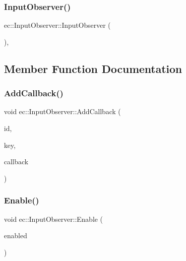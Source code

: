 \mbox{\label{classec_1_1_input_observer_ac8aa31f24d3ea4d627ab7fe899c93b03}} 
\subsubsection{\texorpdfstring{Input\+Observer()}{InputObserver()}}
{\footnotesize\ttfamily ec\+::\+Input\+Observer\+::\+Input\+Observer (\begin{DoxyParamCaption}{ }\end{DoxyParamCaption})\hspace{0.3cm}{\ttfamily [explicit]}, {\ttfamily [protected]}}



\subsection{Member Function Documentation}
\mbox{\label{classec_1_1_input_observer_a361289fd19508f86fa0213de9b64ba50}} 
\subsubsection{\texorpdfstring{Add\+Callback()}{AddCallback()}}
{\footnotesize\ttfamily void ec\+::\+Input\+Observer\+::\+Add\+Callback (\begin{DoxyParamCaption}\item[{const std\+::string \&}]{id,  }\item[{\mbox{\hyperlink{namespaceec_a5de6bdb8c4b2ed6e590e721ec998f964}{Event\+Key\+\_\+T}}}]{key,  }\item[{std\+::function$<$ void()$>$}]{callback }\end{DoxyParamCaption})}

\mbox{\label{classec_1_1_input_observer_ad7e24dae551749986178b6758362d3e5}} 
\subsubsection{\texorpdfstring{Enable()}{Enable()}}
{\footnotesize\ttfamily void ec\+::\+Input\+Observer\+::\+Enable (\begin{DoxyParamCaption}\item[{const bool}]{enabled }\end{DoxyParamCaption})\hspace{0.3cm}{\ttfamily [virtual]}}


